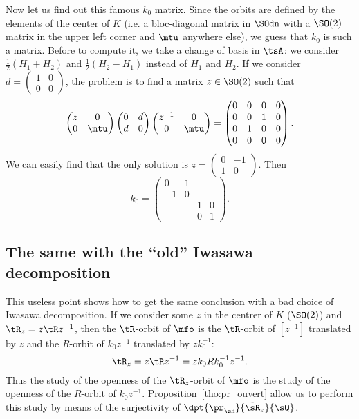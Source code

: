 Now let us find out this famous $k_0$ matrix. Since the orbits are defined by the elements of the center of $K$ (i.e. a bloc-diagonal matrix in $\SOdn$ with a $\SO(2)$ matrix in the upper left corner and $\mtu$ anywhere else), we guess that $k_0$ is such a matrix. Before to compute it, we take a change of basis in $\tsA$: we consider $\frac{1}{2}(H_1+H_2)$ and $\frac{1}{2}(H_2-H_1)$ instead of $H_1$ and $H_2$. If we consider $d=\begin{pmatrix} 1&0\\0&0 \end{pmatrix}$, the problem is to find a matrix $z\in \SO(2)$ such that
\[
   \begin{pmatrix}
     z&0\\
     0&\mtu
   \end{pmatrix}
   \begin{pmatrix}
     0&d\\
     d&0
   \end{pmatrix}
   \begin{pmatrix}
     z^{-1}&0\\
     0&\mtu
   \end{pmatrix}
   =
   \begin{pmatrix}
    0&0&0&0\\
    0&0&1&0\\
    0&1&0&0\\
    0&0&0&0
   \end{pmatrix}.
\]
We can easily find that the only solution is
$z=\begin{pmatrix}
     0&-1\\
     1&0
   \end{pmatrix}$.
Then
\begin{equation}
  k_0=
  \begin{pmatrix}
    0 &1&&\\
    -1&0&&\\
    &&1&0\\
    &&0&1
   \end{pmatrix}.
\end{equation}

\subsection{The same with the  ``old'' Iwasawa decomposition}

This useless point shows how to get the same conclusion with a bad choice of Iwasawa decomposition. If we consider some $z$ in the centrer of $K$ ($\SO(2)$) and $\tR_z=z\tR z^{-1}$, then the $\tR$-orbit of $\mfo$ is the $\tR$-orbit of $[z^{-1}]$ translated by $z$ and the $R$-orbit of $k_0z^{-1}$ translated by $zk_0^{-1}$:
\begin{equation}
   \tR_z=z\tR z^{-1}=zk_0 Rk_0^{-1} z^{-1}.
\end{equation}
Thus the study of the openness of the $\tR_z$-orbit of $\mfo$ is the study of the openness of the $R$-orbit of $k_0z^{-1}$. Proposition~\ref{tho:pr_ouvert} allow us to perform this study by means of the surjectivity of $\dpt{\pr_{\sH}}{\tilde{\sR}_z}{\sQ}$.

